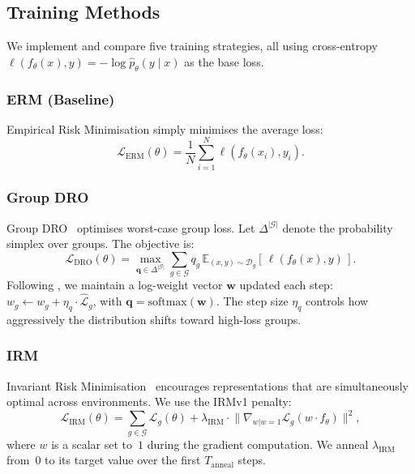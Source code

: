 \documentclass[10pt,twocolumn]{article}
\newcommand{\loss}{\mathcal{L}}
\newcommand{\EE}{\mathbb{E}}
\begin{document}
\subsection{Training Methods}
\label{subsec:methods}

We implement and compare five training strategies,
all using cross-entropy $\ell(f_\theta(x), y) =
-\log \hat{p}_\theta(y \mid x)$ as the base loss.

\subsubsection{ERM (Baseline)}
Empirical Risk Minimisation simply minimises the average loss:
\begin{equation}
  \loss_{\mathrm{ERM}}(\theta) =
  \frac{1}{N}\sum_{i=1}^{N} \ell(f_\theta(x_i), y_i).
  \label{eq:erm}
\end{equation}

\subsubsection{Group DRO}
Group DRO~\citep{sagawa2020distributionally} optimises
worst-case group loss.  Let $\Delta^{|\mathcal{G}|}$ denote
the probability simplex over groups.  The objective is:
\begin{equation}
  \loss_{\mathrm{DRO}}(\theta) =
  \max_{\bm{q} \in \Delta^{|\mathcal{G}|}}
  \sum_{g \in \mathcal{G}} q_g \,
  \EE_{(x,y)\sim\mathcal{D}_g}[\,\ell(f_\theta(x), y)\,].
  \label{eq:gdro}
\end{equation}
Following \citet{sagawa2020distributionally}, we maintain a
log-weight vector $\bm{w}$ updated each step:
$w_g \leftarrow w_g + \eta_q \cdot \hat{\loss}_g$, with
$\bm{q} = \mathrm{softmax}(\bm{w})$.
The step size $\eta_q$ controls how aggressively the
distribution shifts toward high-loss groups.

\subsubsection{IRM}
Invariant Risk Minimisation~\citep{arjovsky2019invariant}
encourages representations that are simultaneously optimal
across environments.  We use the IRMv1 penalty:
\begin{equation}
  \loss_{\mathrm{IRM}}(\theta) =
  \sum_{g \in \mathcal{G}} \loss_g(\theta)
  + \lambda_{\mathrm{IRM}} \cdot
  \bigl\lVert \nabla_{w|w=1}
  \loss_g(w \cdot f_\theta) \bigr\rVert^2,
  \label{eq:irm}
\end{equation}
where $w$ is a scalar set to~$1$ during the gradient
computation.  We anneal $\lambda_{\mathrm{IRM}}$ from~$0$ to
its target value over the first $T_{\mathrm{anneal}}$ steps.
\end{document}
